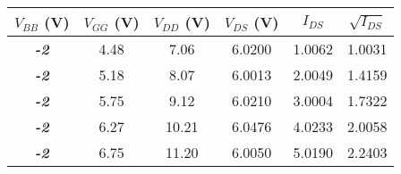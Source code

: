 \begin{tabular}{@{}cccccc@{}}
\toprule
\textbf{$V_{BB}$ (V)} & \multicolumn{1}{l}{\textbf{$V_{GG}$ (V)}} & \textbf{$V_{DD}$ (V)} & \textbf{$V_{DS}$ (V)} & \textbf{$I_{DS}$} & \textbf{$\sqrt{I_{DS}}$} \\ \midrule
\textit{\textbf{-2}}     &  4.48     &  7.06     & 6.0200       &  1.0062    & 1.0031  \\
\textit{\textbf{-2}}     &  5.18     &  8.07     & 6.0013      &  2.0049     & 1.4159\\
\textit{\textbf{-2}}     &  5.75     &  9.12     & 6.0210  &    3.0004  & 1.7322\\
\textit{\textbf{-2}}     &  6.27     &  10.21     & 6.0476    & 4.0233  & 2.0058  \\
\textit{\textbf{-2}}     &  6.75     &  11.20     & 6.0050   & 5.0190   & 2.2403  \\ \bottomrule
\end{tabular}